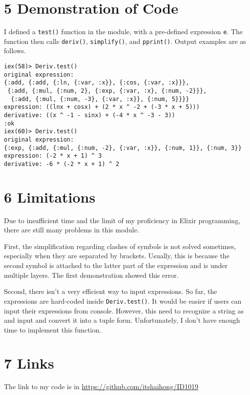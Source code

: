 \documentclass[a4paper,11pt]{article}
\begin{document}
\section*{5 Demonstration of Code}
I defined a {\tt test()} function in the module, with a pre-defined expression {\tt e}. The function then calls {\tt deriv()}, {\tt simplify()}, and {\tt pprint()}. Output examples are as follows.
\begin{verbatim}
iex(58)> Deriv.test()  
original expression:
{:add, {:add, {:ln, {:var, :x}}, {:cos, {:var, :x}}},
 {:add, {:mul, {:num, 2}, {:exp, {:var, :x}, {:num, -2}}},
  {:add, {:mul, {:num, -3}, {:var, :x}}, {:num, 5}}}}
expression: ((lnx + cosx) + (2 * x ^ -2 + (-3 * x + 5)))
derivative: ((x ^ -1 - sinx) + (-4 * x ^ -3 - 3))
:ok
iex(60)> Deriv.test()                                                       
original expression:
{:exp, {:add, {:mul, {:num, -2}, {:var, :x}}, {:num, 1}}, {:num, 3}}
expression: (-2 * x + 1) ^ 3
derivative: -6 * (-2 * x + 1) ^ 2
\end{verbatim}

\section*{6 Limitations}
Due to insufficient time and the limit of my proficiency in Elixir programming, there are still many problems in this module.

First, the simplification regarding clashes of symbols is not solved sometimes, especially when they are separated by brackets. Usually, this is because the second symbol is attached to the latter part of the expression and is under multiple layers. The first demonstration showed this error.

Second, there isn't a very efficient way to input expressions. So far, the expressions are hard-coded inside {\tt Deriv.test()}. It would be easier if users can input their expressions from console. However, this need to recognize a string as and input and convert it into a tuple form. Unfortunately, I don't have enough time to implement this function.

\section*{7 Links}
The link to my code is in \url{https://github.com/itshaihong/ID1019}
\end{document}
